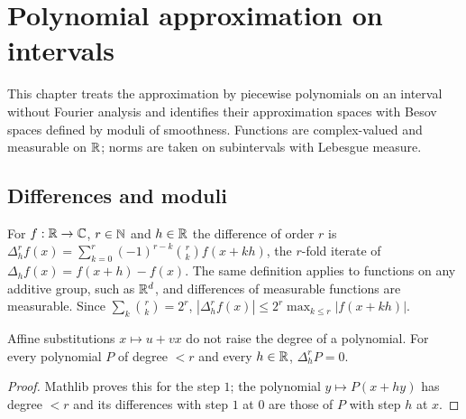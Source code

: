 \chapter{Polynomial approximation on intervals}
\label{ch:interval}

This chapter treats the approximation by piecewise polynomials on an interval without
Fourier analysis and identifies their approximation spaces with Besov spaces defined by
moduli of smoothness. Functions are complex-valued and measurable on $\mathbb{R}$; norms are taken
on subintervals with Lebesgue measure.

\section{Differences and moduli}

\begin{definition}
\label{def:iter-diff}
\leanok
For $f : \mathbb{R} \to \mathbb{C}$, $r \in \mathbb{N}$ and $h \in \mathbb{R}$ the difference of order $r$ is
$\Delta_h^r f(x) = \sum_{k=0}^r (-1)^{r-k} \binom{r}{k} f(x + k h)$, the $r$-fold iterate of
$\Delta_h f(x) = f(x + h) - f(x)$. The same definition applies to functions on any additive
group, such as $\mathbb{R}^d$, and differences of measurable functions are measurable. Since
$\sum_k \binom{r}{k} = 2^r$, $|\Delta_h^r f(x)| \leq 2^r \max_{k \leq r} |f(x + k h)|$.
\end{definition}

\begin{lemma}
\label{lem:iter-diff-poly}
\leanok
{}
Affine substitutions $x \mapsto u + v x$ do not raise the degree of a polynomial. For every
polynomial $P$ of degree $< r$ and every $h \in \mathbb{R}$, $\Delta_h^r P = 0$.
\end{lemma}

\begin{proof}
\leanok
Mathlib proves this for the step $1$; the polynomial $y \mapsto P(x + h y)$ has degree $< r$ and
its differences with step $1$ at $0$ are those of $P$ with step $h$ at $x$.
\end{proof}

